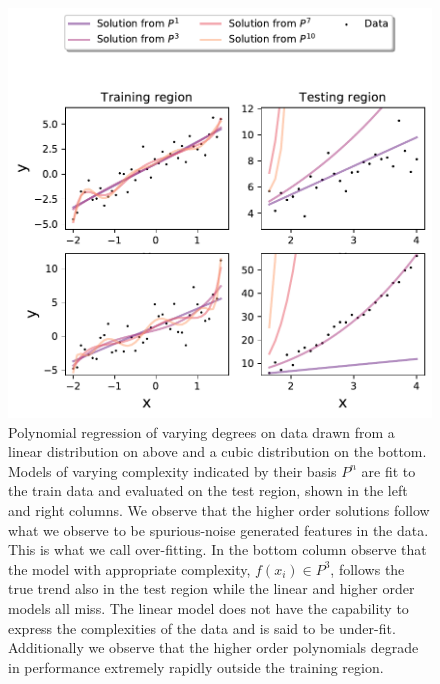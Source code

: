 \begin{figure}
\centering
\includegraphics[width=\textwidth]{../figures/y_distr.pdf}
\caption[Illustrating over-fitting with polynomial regression]{Polynomial regression of varying degrees on data drawn from a linear distribution on above and a cubic distribution on the bottom. Models of varying complexity indicated by their basis $P^n$ are fit to the train data and evaluated on the test region, shown in the left and right columns. We observe that the higher order solutions follow what we observe to be  spurious-noise generated features in the data. This is what we call over-fitting. In the bottom column observe that the model with appropriate complexity, $f(x_i) \in P^3$, follows the true trend also in the test region while the linear and higher order models all miss. The linear model does not have the capability to express the complexities of the data and is said to be under-fit. Additionally we observe that the higher order polynomials degrade in performance extremely rapidly outside the training region.}\label{fig:overfit}
\end{figure}

